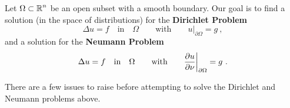 Let $\displaystyle \Omega \subset \mathbb{R}^n$ be an open subset with a
smooth boundary.
Our goal is to find a solution (in the space of distributions) for the
{\bfseries Dirichlet Problem}
\begin{equation} \label{laplace_diri_probl}
\Delta u = f \quad \text{in} \quad \Omega \qquad \text{with}
\qquad u\big|_{\partial \Omega} = g \ ,
\end{equation}
and a solution for the
{\bfseries Neumann Problem}
\begin{equation} \label{laplace_neum_probl}
\Delta u = f \quad \text{in} \quad \Omega \qquad \text{with} \qquad
\frac{\partial{u}}{\partial \nu}\bigg|_{\partial \Omega} = g \ .
\end{equation}

There are a few issues to raise before attempting to solve the Dirichlet
and Neumann problems above.

